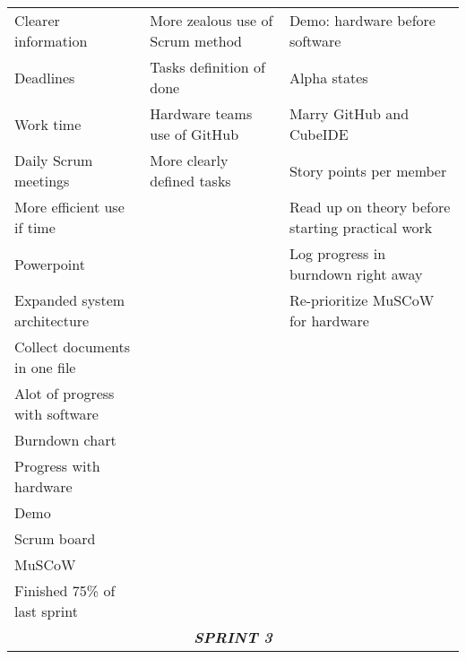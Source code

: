 \begin{table}[htbp]
{\begin{tabular}{lll}
Clearer information                 & More zealous use of Scrum method   & Demo: hardware before software                   \\
Deadlines                           & Tasks definition of done           & Alpha states                                     \\
Work time                           & Hardware teams use of GitHub       & Marry GitHub and CubeIDE                         \\
Daily Scrum meetings                & More clearly defined tasks         & Story points per member                          \\
More efficient use if  time         &                                    & Read up on theory before starting practical work \\
Powerpoint                          &                                    & Log progress in burndown right away              \\
Expanded system architecture        &                                    & Re-prioritize MuSCoW for hardware                \\
Collect documents in one file       &                                    &                                                  \\
Alot of progress with software      &                                    &                                                  \\
Burndown chart                      &                                    &                                                  \\
Progress with hardware              &                                    &                                                  \\
Demo                                &                                    &                                                  \\
Scrum board                         &                                    &                                                  \\
MuSCoW                              &                                    &                                                  \\
Finished 75\% of last sprint        &                                    &                                                  \\ \hline
\multicolumn{3}{c}{\rowcolor{grey} \textit{\textbf{SPRINT 3}}}                                                                              \\ \hline

\end{tabular}}
\end{table}
